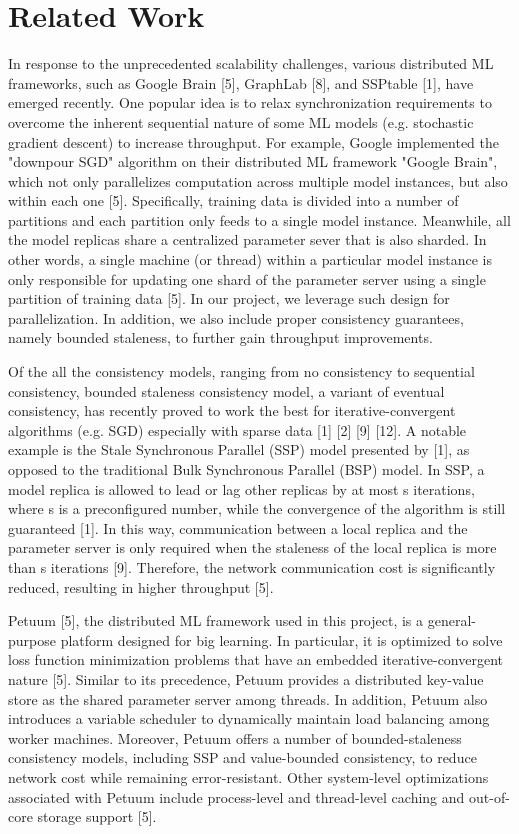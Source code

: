 \documentclass{article} %
\begin{document}
\section{Related Work}
\label{gen_inst}

In response to the unprecedented scalability challenges, various distributed ML frameworks, such as Google Brain [5], GraphLab [8], and SSPtable [1], have emerged recently. One popular idea is to relax synchronization requirements to overcome the inherent sequential nature of some ML models (e.g. stochastic gradient descent) to increase throughput. For example, Google implemented the "downpour SGD" algorithm on their distributed ML framework "Google Brain", which not only parallelizes computation across multiple model instances, but also within each one [5]. Specifically, training data is divided into a number of partitions and each partition only feeds to a single model instance. Meanwhile, all the model replicas share a centralized parameter sever that is also sharded. In other words, a single machine (or thread) within a particular model instance is only responsible for updating one shard of the parameter server using a single partition of training data [5]. In our project, we leverage such design for parallelization. In addition, we also include proper consistency guarantees, namely bounded staleness, to further gain throughput improvements.

Of the all the consistency models, ranging from no consistency to sequential consistency, bounded staleness consistency model, a variant of eventual consistency, has recently proved to work the best for iterative-convergent algorithms (e.g. SGD) especially with sparse data [1] [2] [9] [12]. A notable example is the Stale Synchronous Parallel (SSP) model presented by [1], as opposed to the traditional Bulk Synchronous Parallel (BSP) model. In SSP, a model replica is allowed to lead or lag other replicas by at most s iterations, where s is a preconfigured number, while the convergence of the algorithm is still guaranteed [1]. In this way, communication between a local replica and the parameter server is only required when the staleness of the local replica is more than s iterations [9]. Therefore, the network communication cost is significantly reduced, resulting in higher throughput [5].

Petuum [5], the distributed ML framework used in this project, is a general-purpose platform designed for big learning. In particular, it is optimized to solve loss function minimization problems that have an embedded iterative-convergent nature [5]. Similar to its precedence, Petuum provides a distributed key-value store as the shared parameter server among threads. In addition, Petuum also introduces a variable scheduler to dynamically maintain load balancing among worker machines. Moreover, Petuum offers a number of bounded-staleness consistency models, including SSP and value-bounded consistency, to reduce network cost while remaining error-resistant. Other system-level optimizations associated with Petuum include process-level and thread-level caching and out-of-core storage support [5].
\end{document}

